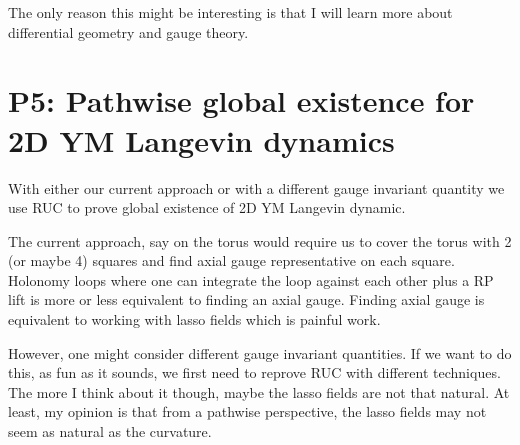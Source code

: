 \documentclass[./main.tex]{subfiles}
\begin{document}
The only reason this might be interesting is that I will learn more about differential geometry and gauge theory. 


\section{P5: Pathwise global existence for 2D YM Langevin dynamics}
With either our current approach or with a different gauge invariant quantity we use RUC to prove global existence of 2D YM Langevin dynamic. 

The current approach, say on the torus would require us to cover the torus with 2 (or maybe 4) squares and find axial gauge representative on each square. Holonomy loops where one can integrate the loop against each other plus a RP lift is more or less equivalent to finding an axial gauge. Finding axial gauge is equivalent to working with lasso fields which is painful work. 

However, one might consider different gauge invariant quantities. If we want to do this, as fun as it sounds, we first need to reprove RUC with different techniques. The more I think about it though, maybe the lasso fields are not that natural. At least, my opinion is that from a pathwise perspective, the lasso fields may not seem as natural as the curvature. 
\end{document}
